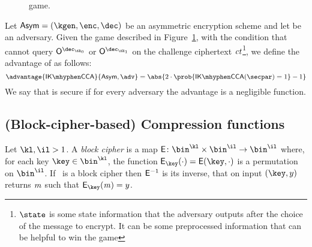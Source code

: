 \begin{figure}[h!]
    \centering
\caption{\ikcca{} game.}\label{fig:ikcca}
\end{figure}

\begin{definition}[\ikcca]\label{preliminaries:def:ikcca}
    Let $\aSym = (\kgen,\enc, \dec)$ be an asymmetric encryption scheme and let \adv{} be an adversary. Given the \ikcca{} game described in Figure~\ref{fig:ikcca}, with the condition that \adv{} cannot query $\oracle{\dec_{\sk_0}}$ or $\oracle{\dec_{\sk_1}}$ on the challenge ciphertext $\mathit{ct}$\footnote{$\state$ is some state information that the adversary outputs after the choice of the message to encrypt. It can be some preprocessed information that can be helpful to win the game}, we define the \ikcca{} advantage of \adv{} as follows:
    \[
        \advantage{\ikcca}{\aSym,\adv} =  \abs{2\cdot\prob{\ikcca(\secpar) = 1} - 1}
    \]
    We say that \aSym{} is \ikcca{} secure if for every \ppt{} adversary \adv{} the advantage \advantage{\ikcca}{\aSym,\adv} is a negligible function.
\end{definition}

\subsection{(Block-cipher-based) Compression functions}\label{preliminaries:definitions:hashcomp}

\begin{definition}
    Let $\kl, \il > 1$. A \emph{block cipher} is a map $\Enc \colon \bin^{\kl} \times \bin^{\il} \to \bin^{\il}$ where, for each key $\key \in \bin^{\kl}$, the function $\Enc_\key(\cdot) = \Enc(\key, \cdot)$ is a permutation on $\bin^{\il}$. If \Enc~is a block cipher then $\mathsf{E}^{-1}$ is its inverse, that on input $(\key, y)$ returns $\mathit{m}$ such that $\Enc_\key(\msg) = y$.
\end{definition}

